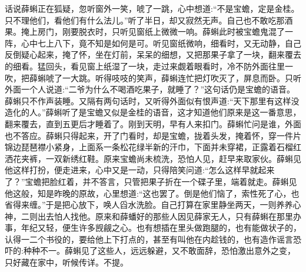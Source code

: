 


\begin{parag}
    话说薛蝌正在狐疑，忽听窗外一笑，唬了一跳，心中想道:“不是宝蟾，定是金桂。只不理他们，看他们有什么法儿。”听了半日，却又寂然无声。自己也不敢吃那酒果。掩上房门，刚要脱衣时，只听见窗纸上微微一响。薛蝌此时被宝蟾鬼混了一阵，心中七上八下，竟不知是如何是可。听见窗纸微响，细看时，又无动静，自己反倒疑心起来，掩了怀，坐在灯前，呆呆的细想，又把那果子拿了一块，翻来覆去的细看。猛回头，看见窗上纸湿了一块，走过来觑着眼看时，冷不防外面往里一吹，把薛蝌唬了一大跳。听得吱吱的笑声，薛蝌连忙把灯吹灭了，屏息而卧。只听外面一个人说道:“二爷为什么不喝酒吃果子，就睡了？”这句话仍是宝蟾的语音。薛蝌只不作声装睡。又隔有两句话时，又听得外面似有恨声道:“天下那里有这样没造化的人。”薛蝌听了是宝蟾又似是金桂的语音，这才知道他们原来是这一番意思，翻来覆去，直到五更后才睡着了。刚到天明，早有人来扣门。薛蝌忙问是谁，外面也不答应。薛蝌只得起来，开了门看时，却是宝蟾，拢着头发，掩着怀，穿一件片锦边琵琶襟小紧身，上面系一条松花绿半新的汗巾，下面并未穿裙，正露着石榴红洒花夹裤，一双新绣红鞋。原来宝蟾尚未梳洗，恐怕人见，赶早来取家伙。薛蝌见他这样打扮，便走进来，心中又是一动，只得陪笑问道:“怎么这样早就起来了？”宝蟾把脸红着，并不答言，只管把果子折在一个碟子里，端着就走。薛蝌见他这般，知是昨晚的原故，心里想道:“这也罢了。倒是他们恼了，索性死了心，也省得来缠。”于是把心放下，唤人舀水洗脸。自己打算在家里静坐两天，一则养养心神，二则出去怕人找他。原来和薛蟠好的那些人因见薛家无人，只有薛蝌在那里办事，年纪又轻，便生许多觊觎之心。也有想插在里头做跑腿的，也有能做状子的，认得一二个书役的，要给他上下打点的，甚至有叫他在内趁钱的，也有造作谣言恐吓的:种种不一。薛蝌见了这些人，远远躲避，又不敢面辞，恐怕激出意外之变，只好藏在家中，听候传详。不提。
\end{parag}


